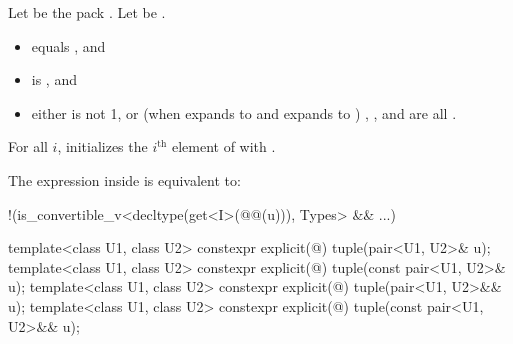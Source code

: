 \documentclass{wg21}
\begin{document}
\begin{itemdescr}
    \pnum
    Let  be the pack .\newline
    Let  be .
    
    \pnum
    \constraints
    \begin{itemize}
        \item
         equals , and
        \item
        is , and
        \item
        either  is not 1, or
        (when  expands to  and
         expands to )
        ,
        , and
         are all .
    \end{itemize}
    
    \pnum
    \effects
    For all $i$, initializes the $i^\textrm{th}$ element of 
    with .
    
    \pnum
    \remarks
    The expression inside  is equivalent to:
    \begin{codeblock}
        !(is_convertible_v<decltype(get<I>(@@(u))), Types> && ...)
    \end{codeblock}
\end{itemdescr}

%
\begin{itemdecl}
    template<class U1, class U2> constexpr explicit(@\seebelow@) tuple(pair<U1, U2>& u);
    template<class U1, class U2> constexpr explicit(@\seebelow@) tuple(const pair<U1, U2>& u);
    template<class U1, class U2> constexpr explicit(@\seebelow@) tuple(pair<U1, U2>&& u);
    template<class U1, class U2> constexpr explicit(@\seebelow@) tuple(const pair<U1, U2>&& u);
\end{itemdecl}
\end{document}
